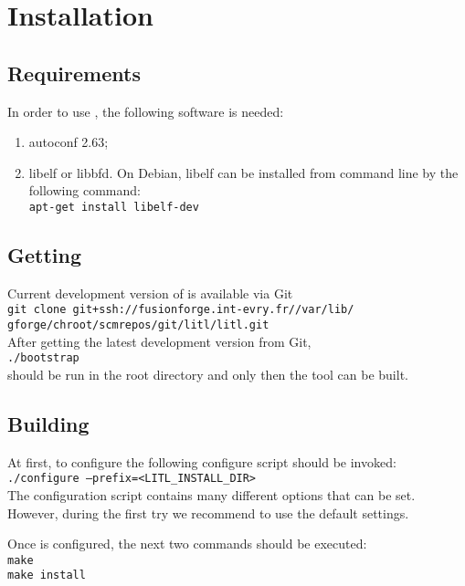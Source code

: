 \chapter{Installation}
\section{Requirements}
In order to use \litl{}, the following software is needed:
\begin{enumerate}
 \item autoconf 2.63;
 
 \item libelf or libbfd. On Debian, libelf can be installed from command line by 
       the following command:\\
       \texttt{apt-get install libelf-dev}
\end{enumerate}

\section{Getting \litl}
Current development version of \litl{} is available via Git\\
    \hspace*{0.9cm}\texttt{git clone git+ssh://fusionforge.int-evry.fr//var/lib/}\\
    \hspace*{0.9cm}\texttt{gforge/chroot/scmrepos/git/litl/litl.git}\\
After getting the latest development version from Git,\\
\hspace*{0.9cm}\texttt{./bootstrap}\\ 
should be run in the root directory and only then the tool can be built.

\section{Building \eztrace{}}
At first, to configure \litl{} the following configure script should be 
invoked:\\
    \hspace*{0.9cm}\texttt{./configure --prefix=<LITL\_INSTALL\_DIR>}\\
The configuration script contains many different options that can be set. 
However, during the first try we recommend to use the default settings.

Once \litl{} is configured, the next two commands should be executed:\\
    \hspace*{0.9cm}\texttt{make}\\
    \hspace*{0.9cm}\texttt{make install}

